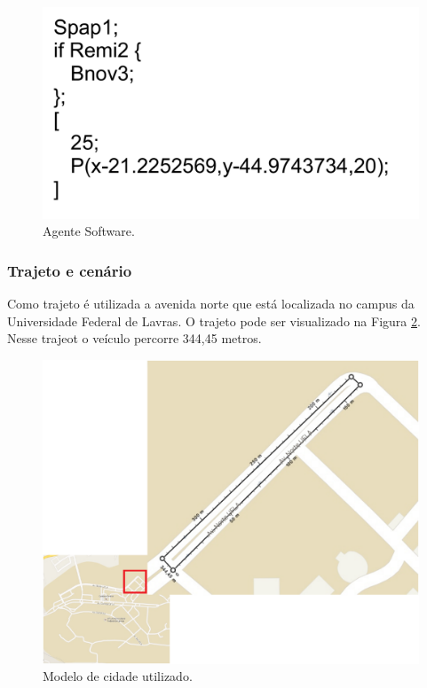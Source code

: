 \begin{figure}[htbp]
	\centering
	\includegraphics[scale=0.3]{metodologia/figuras/exemploCodigoAgente.pdf}
	\caption{Agente Software.}
	\label{fig:exemploCodigoAgente}
\end{figure}

\subsubsection{Trajeto e cenário}

Como trajeto é utilizada a avenida norte que está localizada no campus da Universidade Federal de Lavras. O trajeto pode ser visualizado na Figura \ref{fig:trajetoExperimento}. Nesse trajeot o veículo percorre 344,45 metros. 

\begin{figure}[htbp]
	\centering
	\includegraphics[scale=0.4]{metodologia/figuras/trajetoExperimento.pdf}
	\caption{Modelo de cidade utilizado.}
	\label{fig:trajetoExperimento}
\end{figure}

